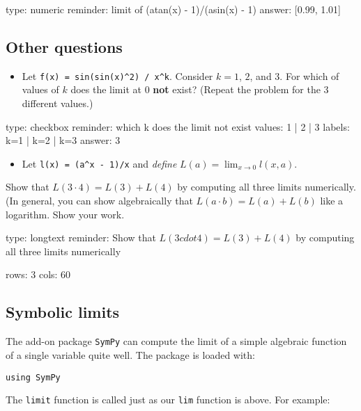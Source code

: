 \documentclass[12pt]{article}
\begin{document}
\begin{answer}
    type: numeric
    reminder: limit of   (atan(x) - 1)/(asin(x) - 1)
    answer: [0.99, 1.01]

\end{answer}

\subsection{Other questions}

\begin{itemize}
\itemsep1pt\parskip0pt
\item
  Let \texttt{f(x) = sin(sin(x)\^{}2) / x\^{}k}. Consider $k=1$, $2$,
  and $3$. For which of values of $k$ does the limit at $0$ \textbf{not}
  exist? (Repeat the problem for the 3 different values.)
\end{itemize}

\begin{answer}
type: checkbox
reminder: which k does the limit not exist
values: 1 | 2 | 3
labels: k=1 | k=2 | k=3
answer: 3
\end{answer}

\begin{itemize}
\itemsep1pt\parskip0pt
\item
  Let \texttt{l(x) = (a\^{}x - 1)/x} and \emph{define}
  $L(a) = \lim_{x\rightarrow 0} l(x,a)$.
\end{itemize}

Show that $L(3 \cdot 4) = L(3) + L(4)$ by computing all three limits
numerically. (In general, you can show algebraically that
$L(a\cdot b) = L(a) + L(b)$ like a logarithm. Show your work.

\begin{answer}
type: longtext
reminder: Show that \( L(3 cdot 4) = L(3) + L(4) \) by computing all three limits numerically

rows: 3
cols: 60
\end{answer}

\subsection{Symbolic limits}

The add-on package \texttt{SymPy} can compute the limit of a simple
algebraic function of a single variable quite well. The package is
loaded with:



\begin{verbatim}
using SymPy
\end{verbatim}
The \texttt{limit} function is called just as our \texttt{lim} function
is above. For example:
\end{document}
